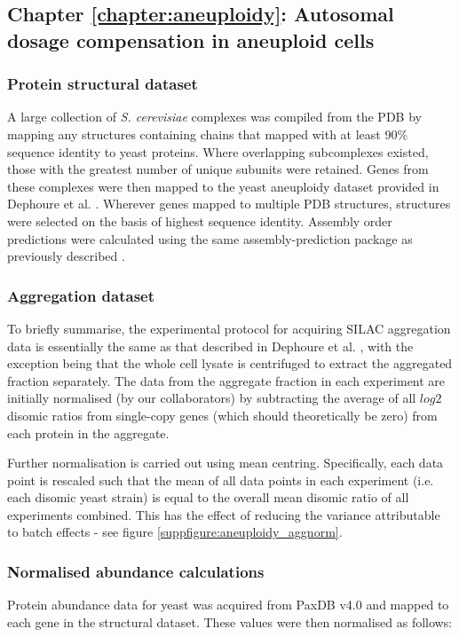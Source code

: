 \documentclass[a4paper,11pt,twoside,openright]{scrbook}
\begin{document}
\subsection{Chapter \ref*{chapter:aneuploidy}: Autosomal dosage compensation in
aneuploid cells}
\subsubsection{Protein structural dataset}
A large collection of \textit{S. cerevisiae} complexes was compiled from the PDB
by mapping any structures containing chains that mapped with at least 90\%
sequence identity to yeast proteins. Where overlapping subcomplexes existed,
those with the greatest number of unique subunits were retained. Genes from
these complexes were then mapped to the yeast aneuploidy dataset provided in
Dephoure et al. \cite{Dephoure2014}. Wherever genes mapped to multiple PDB
structures, structures were selected on the basis of highest sequence identity.
Assembly order predictions were calculated using the same assembly-prediction
package as previously described \cite{Wells2016}.


\subsubsection{Aggregation dataset}
To briefly summarise, the experimental protocol for acquiring SILAC aggregation
data is essentially the same as that described in Dephoure et al.
\cite{Dephoure2014}, with the exception being that the whole cell lysate is
centrifuged to extract the aggregated fraction separately. The data from the
aggregate fraction in each experiment are initially normalised (by our
collaborators) by subtracting the average of all $log{2}$ disomic ratios from
single-copy genes (which should theoretically be zero) from each protein in the
aggregate.

Further normalisation is carried out using mean centring. Specifically, each
data point is rescaled such that the mean of all data points in each experiment
(i.e. each disomic yeast strain) is equal to the overall mean disomic ratio of
all experiments combined. This has the effect of reducing the variance
attributable to batch effects - see figure \ref{suppfigure:aneuploidy_aggnorm}.

\subsubsection{Normalised abundance calculations}
Protein abundance data for yeast was acquired from PaxDB v4.0 \cite{Wang2015}
and mapped to each gene in the structural dataset. These values were then
normalised as follows:
\end{document}
